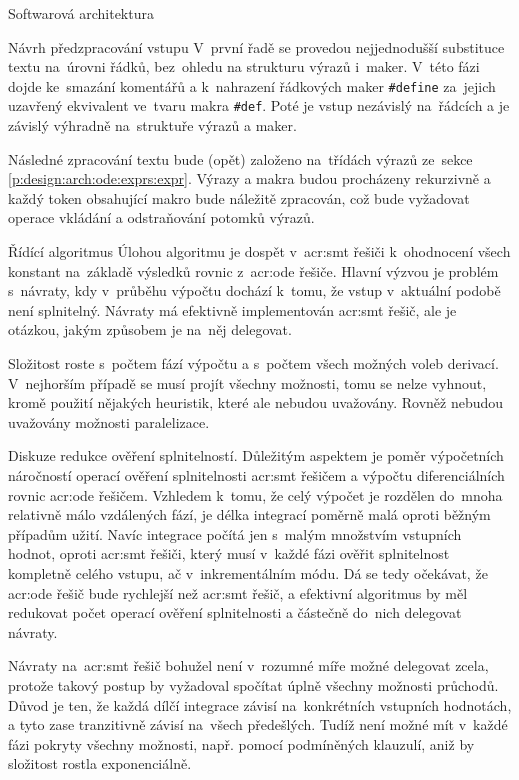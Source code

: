 \documentclass[thesis=M,czech]{FITthesis}[2012/06/26]
\newcommand{\acrlabel}[1]{acr:#1}
\newcommand{\acr}[1]{\acrshort{\acrlabel{#1}}}
\newcommand{\id}[1]{\texttt{#1}}
\newcommand{\rf}[1]{\ref{#1}}
\begin{document}
\begin{section}{Softwarová architektura}
\begin{subsection}{Návrh předzpracování vstupu}
V~první řadě se provedou nejjednodušší substituce textu
na~úrovni řádků, bez~ohledu na strukturu výrazů i~maker.
V~této fázi dojde ke~smazání komentářů
a k~nahrazení řádkových maker \id{\#define}
za~jejich uzavřený ekvivalent ve~tvaru makra \id{\#def}.
Poté je vstup nezávislý na~řádcích
a je závislý výhradně na~struktuře výrazů a maker.

Následné zpracování textu bude (opět) založeno na~třídách výrazů
ze~sekce \rf{p:design:arch:ode:exprs:expr}.
Výrazy a makra budou procházeny rekurzivně
a každý token obsahující makro bude náležitě zpracován,
což bude vyžadovat operace vkládání a odstraňování potomků výrazů.
\end{subsection} %


\begin{subsection}{Řídící algoritmus}\label{ss:design:arch:alg}
Úlohou algoritmu je dospět v~\acr{smt} řešiči
k~ohodnocení všech konstant
na~základě výsledků rovnic z~\acr{ode} řešiče.
Hlavní výzvou je problém s~návraty,
kdy v~průběhu výpočtu dochází k~tomu,
že vstup v~aktuální podobě není splnitelný.
Návraty má efektivně implementován \acr{smt} řešič,
ale je otázkou, jakým způsobem je na~něj delegovat.

Složitost roste s~počtem fází výpočtu
a s~počtem všech možných voleb derivací.
V~nejhorším případě se musí projít všechny možnosti,
tomu se nelze vyhnout, kromě použití nějakých heuristik,
které ale nebudou uvažovány.
Rovněž nebudou uvažovány možnosti paralelizace.


\begin{paragraph}{Diskuze redukce ověření splnitelností.}
\label{ss:design:arch:alg:discuss}
Důležitým aspektem je poměr výpočetních náročností
operací ověření splnitelnosti \acr{smt} řešičem
a výpočtu diferenciálních rovnic \acr{ode} řešičem.
Vzhledem k~tomu, že celý výpočet je rozdělen
do~mnoha relativně málo vzdálených fází,
je délka integrací poměrně malá
oproti běžným případům užití.
Navíc integrace počítá jen s~malým množstvím
vstupních hodnot,
oproti \acr{smt} řešiči,
který musí v~každé fázi ověřit splnitelnost kompletně celého vstupu,
ač v~inkrementálním módu.
Dá se tedy očekávat,
že \acr{ode} řešič bude rychlejší než \acr{smt} řešič,
a efektivní algoritmus by měl redukovat
počet operací ověření splnitelnosti
a částečně do~nich delegovat návraty.

Návraty na~\acr{smt} řešič bohužel není v~rozumné míře
možné delegovat zcela,
protože takový postup by vyžadoval
spočítat úplně všechny možnosti průchodů.
Důvod je ten, že každá dílčí integrace závisí
na~konkrétních vstupních hodnotách,
a tyto zase tranzitivně závisí
na~všech předešlých.
Tudíž není možné mít v~každé fázi
pokryty všechny možnosti,
např. pomocí podmíněných klauzulí,
aniž by složitost rostla exponenciálně.


\end{paragraph}
\end{subsection}
\end{section}
\end{document}
